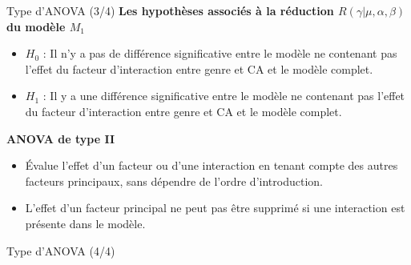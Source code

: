 \documentclass{beamer}
\begin{document}
	\begin{frame}{Type d'ANOVA (3/4)}
		\textbf{Les hypothèses associés à la réduction $R(\gamma|\mu,\alpha,\beta)$ du modèle $M_1$}
		\begin{itemize}
			\item $H_0$ : Il n'y a pas de différence significative entre le modèle ne contenant pas l'effet du facteur d'interaction entre genre et CA et le modèle complet.
			\item $H_1$ : Il y a une différence significative entre le modèle ne contenant pas l'effet du facteur d'interaction entre genre et CA et le modèle complet.
		\end{itemize}
		\pause
		\textbf{ANOVA de type II}
		\begin{itemize}
			\item Évalue l'effet d'un facteur ou d'une interaction en tenant compte des autres facteurs principaux, sans dépendre de l'ordre d'introduction.
			\item L'effet d'un facteur principal ne peut pas être supprimé si une interaction est présente dans le modèle.
		\end{itemize}
	\end{frame}
	
	\begin{frame}{Type d'ANOVA (4/4)}
		\begin{table}[H]
			\centering
			\caption{Table d'analyse de la variance des réductions de type II du modèle $M_1$.}
			\label{ref:analyse_var_2}
		\end{table}
	\end{frame}
	
\end{document}
